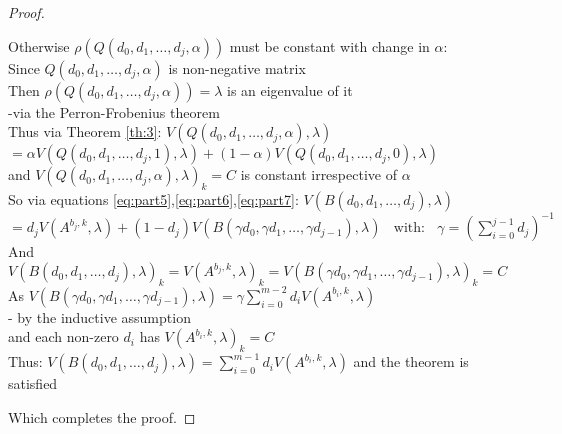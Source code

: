 \begin{proof}
\begin{itemize}[leftmargin=*,labelsep=4mm]
\-\hspace{12mm}Otherwise $\rho(Q(d_0,d_1,\dots,d_{j},\alpha)) $ must be constant with change in $\alpha$:\\
\-\hspace{16mm}Since $Q(d_0,d_1,\dots,d_{j},\alpha)$ is non-negative matrix\\
\-\hspace{16mm}Then $\rho(Q(d_0,d_1,\dots,d_{j},\alpha))=\lambda$ is an eigenvalue of it\\
\-\hspace{16mm}-via the Perron-Frobenius theorem\\
\-\hspace{16mm}Thus via Theorem \ref{th:3}: $V(Q(d_0,d_1,\dots,d_{j},\alpha),\lambda)$\\
\-\hspace{22mm}$ = \alpha V(Q(d_0,d_1,\dots,d_{j},1),\lambda) + (1-\alpha) V(Q(d_0,d_1,\dots,d_{j},0),\lambda)$\\
\-\hspace{16mm}and $V(Q(d_0,d_1,\dots,d_{j},\alpha),\lambda)_k=C$ is constant irrespective of $\alpha$\\
\-\hspace{16mm}So via equations \ref{eq:part5},\ref{eq:part6},\ref{eq:part7}: $V(B(d_0,d_1,\dots,d_{j}),\lambda)$\\
\-\hspace{22mm}$ = d_j V(A^{b_j,k},\lambda) + (1-d_j) V(B(\gamma d_0,\gamma d_1,\dots,\gamma d_{j-1}),\lambda) ~~~~\text{with:}~~~~\gamma = (\sum_{i=0}^{j-1}d_j)^{-1}$\\
\-\hspace{16mm}And $V(B(d_0,d_1,\dots,d_{j}),\lambda)_k=V(A^{b_j,k},\lambda)_k=V(B(\gamma d_0,\gamma d_1,\dots,\gamma d_{j-1}),\lambda)_k=C$\\
\-\hspace{16mm}As $V(B(\gamma d_0,\gamma d_1,\dots,\gamma d_{j-1}),\lambda) = \gamma\sum_{i=0}^{m-2}d_iV(A^{b_i,k},\lambda)$\\
\-\hspace{16mm}- by the inductive assumption\\
\-\hspace{16mm}and each non-zero $d_i$ has $V(A^{b_i,k},\lambda)_k=C$\\
\-\hspace{16mm}Thus: $V(B(d_0,d_1,\dots,d_{j}),\lambda) = \sum_{i=0}^{m-1}d_iV(A^{b_i,k},\lambda)$ and the theorem is satisfied
\end{itemize}
Which completes the proof.
\end{proof}


